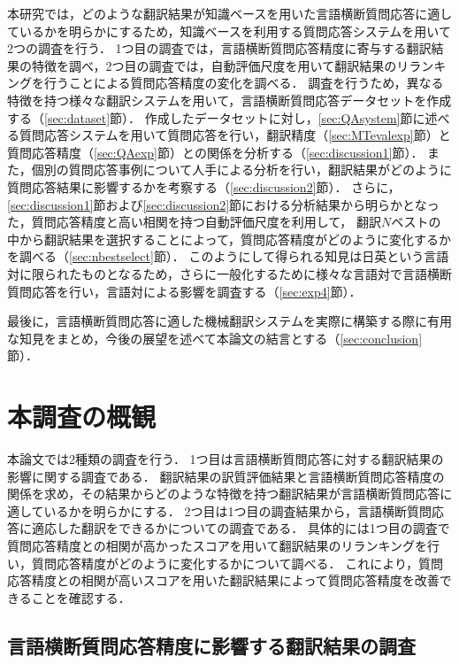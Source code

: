 \documentclass[japanese]{jnlp_1.4}
\begin{document}
本研究では，どのような翻訳結果が知識ベースを用いた言語横断質問応答に適しているかを明らかにするため，知識ベースを利用する質問応答システムを用いて2つの調査を行う．
1つ目の調査では，言語横断質問応答精度に寄与する翻訳結果の特徴を調べ，2つ目の調査では，自動評価尺度を用いて翻訳結果のリランキングを行うことによる質問応答精度の変化を調べる．
調査を行うため，異なる特徴を持つ様々な翻訳システムを用いて，言語横断質問応答データセットを作成する（\ref{sec:dataset}節）．
作成したデータセットに対し，\ref{sec:QAsystem}節に述べる質問応答システムを用いて質問応答を行い，翻訳精度（\ref{sec:MTevalexp}節）と質問応答精度（\ref{sec:QAexp}節）との関係を分析する（\ref{sec:discussion1}節）．
また，個別の質問応答事例について人手による分析を行い，翻訳結果がどのように質問応答結果に影響するかを考察する（\ref{sec:discussion2}節）．
さらに，\ref{sec:discussion1}節および\ref{sec:discussion2}節における分析結果から明らかとなった，質問応答精度と高い相関を持つ自動評価尺度を利用して，	翻訳$N$ベストの中から翻訳結果を選択することによって，質問応答精度がどのように変化するかを調べる（\ref{sec:nbestselect}節）．
{このようにして得られる知見は日英という言語対に限られたものとなるため，さらに一般化するために様々な言語対で言語横断質問応答を行い，言語対による影響を調査する（{\ref{sec:exp4}}節）．}

最後に，言語横断質問応答に適した機械翻訳システムを実際に構築する際に有用な知見をまとめ，今後の展望を述べて本論文の結言とする（\ref{sec:conclusion}節）．


\section{本調査の概観}
\label{sec:how2research}

本論文では2種類の調査を行う．
{1つ目は言語横断質問応答に対する翻訳結果の影響に関する調査である．
翻訳結果の訳質評価結果と言語横断質問応答精度の関係を求め，その結果からどのような特徴を持つ翻訳結果が言語横断質問応答に適しているかを明らかにする．}
2つ目は1つ目の調査結果から，言語横断質問応答に適応した翻訳をできるかについての調査である．
{具体的には1つ目の調査で質問応答精度との相関が高かったスコアを用いて翻訳結果のリランキングを行い，質問応答精度がどのように変化するかについて調べる．
これにより，質問応答精度との相関が高いスコアを用いた翻訳結果によって質問応答精度を改善できることを確認する．}


\subsection{言語横断質問応答精度に影響する翻訳結果の調査}
\label{sec:how2exp1}
\end{document}

